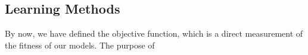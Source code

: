 \subsection {Learning Methods}
By now, we have defined the objective function, which is a direct measurement of the fitness of our models. The purpose of 